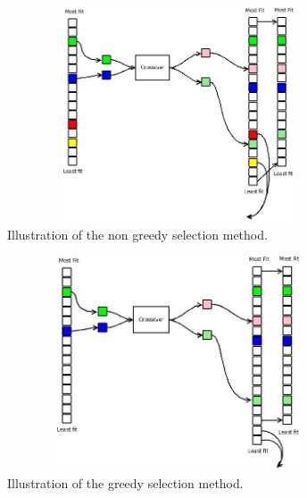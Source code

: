 \documentclass[12pt]{article}
\begin{document}
\begin{figure}[htb]
\begin{center}
\includegraphics[height=2.5in,width=4.0in]{images/non_greedy_selection.jpeg}
\caption{Illustration of the non greedy selection method.}
\end{center}
\end{figure}
\begin{figure}[htb]
\begin{center}
\includegraphics[height=2.5in,width=4.0in]{images/greedy_selection.jpeg}
\caption{Illustration of the greedy selection method.}
\end{center}
\end{figure}
\end{document}
